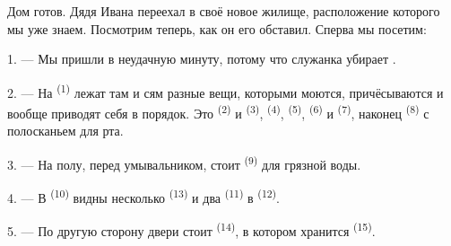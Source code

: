 %
%

\VUsaut{6.0mm}
\VUsaut{1.4mm}
\VUsaut{0.4mm}
\VUsaut{2.2mm}

Дом готов. Дядя Ивана переехал в своё новое жилище, расположение которого
мы уже знаем. Посмотрим теперь, как он его обставил. Сперва мы посетим:

\VUsaut{3.0mm}

1. --- Мы пришли в неудачную минуту, потому что служанка убирает
.

2. --- На  \textsuperscript{(1)} лежат там и сям разные вещи,
которыми моются, причёсываются и вообще приводят себя в порядок. Это
 \textsuperscript{(2)} и  \textsuperscript{(3)},
 \textsuperscript{(4)},  \textsuperscript{(5)},
 \textsuperscript{(6)} и  \textsuperscript{(7)}, наконец
 \textsuperscript{(8)} с полосканьем для рта.

3. --- На полу, перед умывальником, стоит  \textsuperscript{(9)}
для грязной воды.

4. --- В  \textsuperscript{(10)} видны несколько
 \textsuperscript{(13)} и два  \textsuperscript{(11)} в
 \textsuperscript{(12)}.

5. --- По другую сторону двери стоит 
\textsuperscript{(14)}, в котором хранится  \textsuperscript{(15)}.

